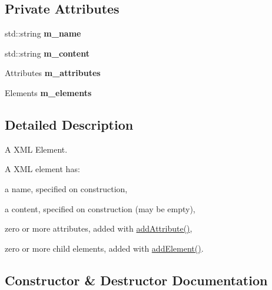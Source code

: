\subsection*{Private Attributes}
\begin{DoxyCompactItemize}
\item 
std\+::string {\bfseries m\+\_\+name}\hypertarget{class_xml_element_a54533a98e9e55bd7978bc58910f9235f}{}\label{class_xml_element_a54533a98e9e55bd7978bc58910f9235f}

\item 
std\+::string {\bfseries m\+\_\+content}\hypertarget{class_xml_element_abeb78115f649d0087cd26ee5c16a9c8f}{}\label{class_xml_element_abeb78115f649d0087cd26ee5c16a9c8f}

\item 
Attributes {\bfseries m\+\_\+attributes}\hypertarget{class_xml_element_a3dc5c8e70fd2bf4bb7b423578ce97e1d}{}\label{class_xml_element_a3dc5c8e70fd2bf4bb7b423578ce97e1d}

\item 
Elements {\bfseries m\+\_\+elements}\hypertarget{class_xml_element_af3449227bc92cd1857d018ba2a587157}{}\label{class_xml_element_af3449227bc92cd1857d018ba2a587157}

\end{DoxyCompactItemize}


\subsection{Detailed Description}
A X\+ML Element. 

A X\+ML element has\+:
\begin{DoxyItemize}
\item a name, specified on construction,
\item a content, specified on construction (may be empty),
\item zero or more attributes, added with \hyperlink{class_xml_element_a14387be9ca6d014a38e95a7aa98f86c5}{add\+Attribute()},
\item zero or more child elements, added with \hyperlink{class_xml_element_a444321a1de2a7f52994c53f9e6e0d942}{add\+Element()}. 
\end{DoxyItemize}

\subsection{Constructor \& Destructor Documentation}
